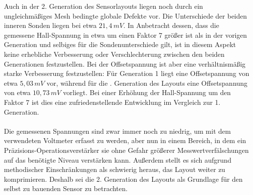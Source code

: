 \documentclass[12pt, a4paper]{article}
\begin{document}
Auch in der 2. Generation des Sensorlayouts liegen noch durch ein ungleichmäßiges Mesh bedingte globale Defekte vor. Die Unterschiede der beiden inneren Sonden liegen bei \newline etwa $21,4\,mV$. In Anbetracht dessen, dass die gemessene Hall-Spannung in etwa um einen Faktor 7 größer ist als in der vorigen Generation und selbiges für die Sondenunterschiede gilt, ist in diesem Aspekt keine erhebliche Verbesserung oder Verschlechterung zwischen den beiden Generationen festzustellen.\newline
Bei der Offsetspannung ist aber eine verhältnismäßig starke Verbesserung festzustellen: Für Generation 1 liegt eine Offsetspannung von etwa $5,03\,mV$ vor, während für die . Generation des Layouts eine Offsetspannung von etwa $10,73\,mV$ vorliegt. Bei einer Erhöhung der Hall-Spannung um den Faktor 7 ist dies eine zufriedenstellende Entwicklung im Vergleich zur 1. Generation.\paragraph{}
\begin{figure}
	\centering
	\captionsetup{type=graph,name=Graph}
	\label{hallV2}
\end{figure}

Die gemessenen Spannungen sind zwar immer noch zu niedrig, um mit dem verwendeten Voltmeter erfasst zu werden, aber nun in einem Bereich, in dem ein Präzisions-Operationsverstärker sie ohne Gefahr größerer Messwertverfälschungen auf das benötigte Niveau verstärken kann. Außerdem stellt es sich aufgrund methodischer Einschränkungen als schwierig heraus, das Layout weiter zu komprimieren. \newline
Deshalb sei die 2. Generation des Layouts als Grundlage für den selbst zu bauenden Sensor zu betrachten.\pagebreak
\end{document}
